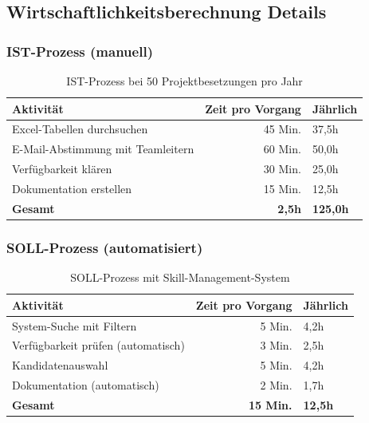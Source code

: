 \subsection{Wirtschaftlichkeitsberechnung Details}

\subsubsection{IST-Prozess (manuell)}

\begin{table}[H]
\centering
\footnotesize
{}
\begin{tabularx}{\textwidth}{|p{6cm}|r|X|}
\hline
\rowcolor{EDAGDunkelgrau!10}
\textbf{Aktivität} & \textbf{Zeit pro Vorgang} & \textbf{Jährlich} \\
\hline
Excel-Tabellen durchsuchen & 45 Min. & 37{,}5h \\
E-Mail-Abstimmung mit Teamleitern & 60 Min. & 50{,}0h \\
Verfügbarkeit klären & 30 Min. & 25{,}0h \\
Dokumentation erstellen & 15 Min. & 12{,}5h \\
\hline
\rowcolor{EDAGDunkelgrau!30}
\textbf{Gesamt} & \textbf{2{,}5h} & \textbf{125{,}0h} \\
\hline
\end{tabularx}
\caption{IST-Prozess bei 50 Projektbesetzungen pro Jahr}
\label{tab:ist_prozess_detail}
\end{table}

\subsubsection{SOLL-Prozess (automatisiert)}

\begin{table}[H]
\centering
\footnotesize
{}
\begin{tabularx}{\textwidth}{|p{6cm}|r|X|}
\hline
\rowcolor{EDAGDunkelgrau!10}
\textbf{Aktivität} & \textbf{Zeit pro Vorgang} & \textbf{Jährlich} \\
\hline
System-Suche mit Filtern & 5 Min. & 4{,}2h \\
Verfügbarkeit prüfen (automatisch) & 3 Min. & 2{,}5h \\
Kandidatenauswahl & 5 Min. & 4{,}2h \\
Dokumentation (automatisch) & 2 Min. & 1{,}7h \\
\hline
\rowcolor{EDAGDunkelgrau!30}
\textbf{Gesamt} & \textbf{15 Min.} & \textbf{12{,}5h} \\
\hline
\end{tabularx}
\caption{SOLL-Prozess mit Skill-Management-System}
\label{tab:soll_prozess_detail}
\end{table}


